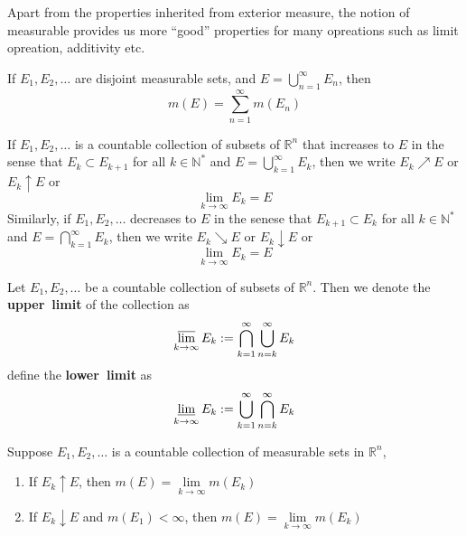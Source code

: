 \documentclass{ctexbook}
\begin{document}
Apart from the properties inherited from exterior measure, the notion of measurable provides us more ``good'' properties
for many opreations such as limit opreation, additivity etc. 

\begin{thm}
    If $E_1,E_2,\ldots$ are disjoint measurable sets, and $E = \bigcup\limits_{n=1}^{\infty}E_n$, then
    \[m(E)=\sum\limits_{n=1}^{\infty}m(E_n)\]
\end{thm}

\begin{define}
    If $E_1,E_2,\ldots$ is a countable collection of subsets of $\mathbb{R}^n$ that increases to $E$ in the sense that
    $E_k \subset E_{k+1}$ for all $k \in \mathbb{N}^*$ and $E = \bigcup\limits_{k=1}^\infty E_k$, then we write 
    $E_k \nearrow E$ or $E_k \uparrow E$ or \[\lim \limits_{k\rightarrow \infty}E_k = E\]
    Similarly, if $E_1,E_2,\ldots$ decreases to $E$ in the senese that $E_{k+1} \subset E_k$ for all $k \in \mathbb{N}^*$
    and $E = \bigcap\limits_{k=1}^{\infty}E_k$, then we write 
    $E_k \searrow E$ or $E_k \downarrow E$ or \[\lim \limits_{k\rightarrow \infty}E_k = E\]
\end{define}

\begin{define}
    Let $E_1, E_2,\ldots$ be a countable collection of subsets of $\mathbb{R}^n$. Then we denote the \textbf{upper~limit} of the
    collection as \[\varlimsup \limits_{k \rightarrow \infty} E_k := \bigcap\limits_{k=1}^\infty\bigcup\limits_{n=k}^\infty E_k \]
    define the \textbf{lower~limit} as
    \[\varliminf \limits_{k \rightarrow \infty} E_k := \bigcup\limits_{k=1}^\infty\bigcap\limits_{n=k}^\infty E_k \]
\end{define}

\begin{cor}
    Suppose $E_1,E_2,\ldots$ is a countable collection of measurable sets in $\mathbb{R}^n$,
    \begin{enumerate}
        \item If $E_k \uparrow E$, then $m(E)=\lim\limits_{k \rightarrow \infty} m(E_k)$
        \item If $E_k \downarrow E$ and $m(E_1)<\infty$, then $m(E) = \lim\limits_{k \rightarrow \infty} m(E_k)$
    \end{enumerate}
\end{cor}
\end{document}
